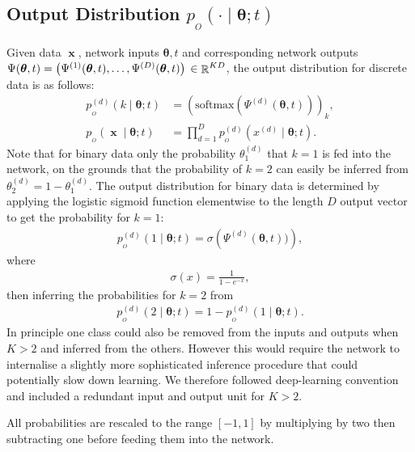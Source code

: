 \documentclass[11pt,table]{article}
\DeclareMathOperator{\x}{\mathbf{x}}
\DeclareMathOperator{\R}{\mathbb{R}}
\newcommand{\didx}[2]{#1^{(#2)}}
\renewcommand{\vec}[1]{\boldsymbol{#1}}
\newcommand{\pars}{\theta}
\newcommand{\parsn}{\vec{\pars}}
\newcommand{\0}[1]{\constvec{0}{#1}}
\newcommand{\1}[1]{\constvec{1}{#1}}
\newcommand{\xdd}[1]{\didx{x}{#1}}
\def\net{\Psi\xspace}
\newcommand{\out}{p_{_O}}
\begin{document}
\subsection{Output Distribution \texorpdfstring{$\out(\cdot \mid \parsn; t)$}{}}\label{sec:disc_output}
Given data $\x$, network inputs $\parsn, t$ and corresponding network outputs $\net(\parsn, t) = \left(\didx{\net}{1}(\parsn, t),\dots,\didx{\net}{D}(\parsn, t)\right)\\ \in \R^{KD}$, the output distribution for discrete data is as follows:
\begin{align}
\out^{(d)}(k \mid \parsn; t) &= \left(\text{softmax}(\didx{\net}{d}(\parsn, t))\right)_k,\\
\out(\x \mid \parsn; t) &= \prod_{d=1}^D \out^{(d)}(\xdd{d} \mid \parsn; t).\label{disc_pred_dist}
\end{align}
Note that for binary data only the probability $\theta^{(d)}_1$ that $k=1$ is fed into the network, on the grounds that the probability of $k=2$ can easily be inferred from $\theta^{(d)}_2 = 1 - \theta^{(d)}_1$.
The output distribution for binary data is determined by applying the logistic sigmoid function elementwise to the length $D$ output vector to get the probability for $k=1$:
\begin{align}
\out^{(d)}(1 \mid \parsn; t) = \sigma\left(\didx{\net}{d}(\parsn, t))\right),
\end{align}
where
\begin{align}
\sigma(x) =  \frac{1}{1-e^{-x}},
\end{align}
then inferring the probabilities for $k=2$ from
\begin{align}
\out^{(d)}(2 \mid \parsn; t) = 1 - \out^{(d)}(1 \mid \parsn; t).
\end{align}
In principle one class could also be removed from the inputs and outputs when $K > 2$ and inferred from the others.
However this would require the network to internalise a slightly more sophisticated inference procedure that could potentially slow down learning.
We therefore followed deep-learning convention and included a redundant input and output unit for $K>2$.

All probabilities are rescaled to the range $[-1, 1]$ by multiplying by two then subtracting one before feeding them into the network.
\end{document}
